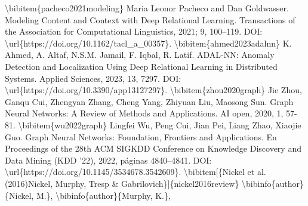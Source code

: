 \documentclass{article}%
\begin{document}
\newline%
\textbackslash{}bibitem\{pacheco2021modeling\}\newline%
Maria Leonor Pacheco and Dan Goldwasser.\newline%
Modeling Content and Context with Deep Relational Learning.\newline%
Transactions of the Association for Computational Linguistics, 2021; 9, 100–119.\newline%
DOI: \textbackslash{}url\{https://doi.org/10.1162/tacl\_a\_00357\}.\newline%
\newline%
\textbackslash{}bibitem\{ahmed2023adalnn\}\newline%
K. Ahmed, A. Altaf, N.S.M. Jamail, F. Iqbal, R. Latif.\newline%
ADAL{-}NN: Anomaly Detection and Localization Using Deep Relational Learning in Distributed Systems.\newline%
Applied Sciences, 2023, 13, 7297.\newline%
DOI: \textbackslash{}url\{https://doi.org/10.3390/app13127297\}.\newline%
\newline%
\textbackslash{}bibitem\{zhou2020graph\}\newline%
Jie Zhou, Ganqu Cui, Zhengyan Zhang, Cheng Yang, Zhiyuan Liu, Maosong Sun.\newline%
Graph Neural Networks: A Review of Methods and Applications.\newline%
AI open, 2020, 1, 57{-}81.\newline%
\newline%
\textbackslash{}bibitem\{wu2022graph\}\newline%
Lingfei Wu, Peng Cui, Jian Pei, Liang Zhao, Xiaojie Guo.\newline%
Graph Neural Networks: Foundation, Frontiers and Applications.\newline%
En Proceedings of the 28th ACM SIGKDD Conference on Knowledge Discovery and Data Mining (KDD '22), 2022, páginas 4840–4841.\newline%
DOI: \textbackslash{}url\{https://doi.org/10.1145/3534678.3542609\}.\newline%
\newline%
\textbackslash{}bibitem{[}\{Nickel et al.(2016)Nickel, Murphy, Tresp \&\newline%
Gabrilovich\}{]}\{nickel2016review\}\newline%
\textbackslash{}bibinfo\{author\}\{Nickel, M.\}, \textbackslash{}bibinfo\{author\}\{Murphy, K.\},\newline%
\end{document}
